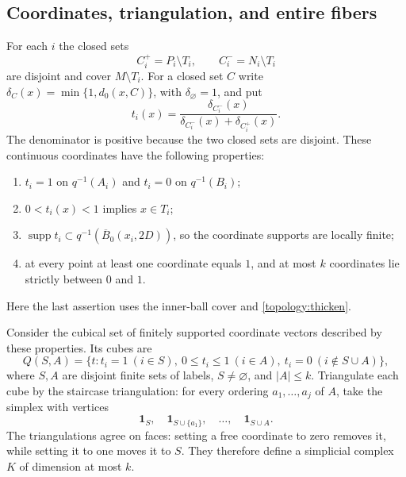 \documentclass[11pt]{article}
\numberwithin{equation}{section}
\theoremstyle{definition}
\theoremstyle{remark}
\begin{document}
\subsection{Coordinates, triangulation, and entire fibers}

For each $i$ the closed sets
\[
 C_i^+=P_i\setminus T_i,\qquad C_i^-=N_i\setminus T_i
\]
are disjoint and cover $M\setminus T_i$.  For a closed set $C$ write
$\delta_C(x)=\min\{1,d_0(x,C)\}$, with $\delta_\varnothing=1$, and put
\begin{equation}\label{topology:coordinates}
 t_i(x)=\frac{\delta_{C_i^-}(x)}
                    {\delta_{C_i^-}(x)+\delta_{C_i^+}(x)}.
\end{equation}
The denominator is positive because the two closed sets are disjoint.
These continuous coordinates have the following properties:
\begin{enumerate}[label=(\roman*)]
 \item $t_i=1$ on $q^{-1}(A_i)$ and $t_i=0$ on $q^{-1}(B_i)$;
 \item $0<t_i(x)<1$ implies $x\in T_i$;
 \item $\operatorname{supp} t_i\subset q^{-1}(\overline B_0(x_i,2D))$,
       so the coordinate supports are locally finite;
 \item at every point at least one coordinate equals $1$, and at most
       $k$ coordinates lie strictly between $0$ and $1$.
\end{enumerate}
Here the last assertion uses the inner-ball cover and
\cref{topology:thicken}.

Consider the cubical set of finitely supported coordinate vectors
described by these properties.  Its cubes are
\[
 Q(S,A)=\{t:t_i=1\ (i\in S),\ 0\le t_i\le1\ (i\in A),
                    \ t_i=0\ (i\notin S\cup A)\},
\]
where $S,A$ are disjoint finite sets of labels, $S\ne\varnothing$, and
$|A|\le k$.  Triangulate each cube by the staircase triangulation: for
every ordering $a_1,\ldots,a_j$ of $A$, take the simplex with vertices
\begin{equation}\label{topology:staircase}
 \mathbf1_S,\quad \mathbf1_{S\cup\{a_1\}},\quad\ldots,\quad
 \mathbf1_{S\cup A}.
\end{equation}
The triangulations agree on faces: setting a free coordinate to zero
removes it, while setting it to one moves it to $S$.  They therefore
define a simplicial complex $K$ of dimension at most $k$.
\end{document}
